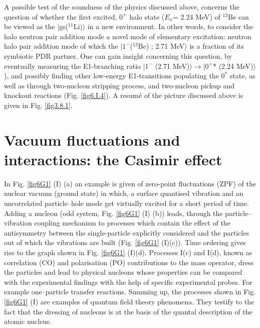 \begin{subappendices}
A  possible test of the soundness of the physics  discussed above, concerns the question of whether the first excited, 
$0^+$ halo state ($E_x$= 2.24 MeV) of $^{12}$Be can be viewed as the $|$gs($^{11}$Li$)\rangle$ in a new environment. In other words, 
to consider the halo neutron pair addition mode
 a novel mode of  elementary excitation: neutron halo pair  addition mode of which the $|1^- $($^{12}$Be) ; 2.71 MeV$\rangle $ is 
 a fraction of  its symbiotic  PDR partner. One can gain insight concerning this question, by 
 eventually measuring the E1-branching ratio $|1^-$ (2.71 MeV)$\rangle  \to |0^+$* (2.24 MeV)$\rangle$ ), and possibly 
 finding other low-energy E1-transitions populating the $0^*$ state, as well as through  two-nucleon stripping process,
 and two-nucleon pickup and knockout reactions (Fig. \ref{fig6.I.4}).
 A resum\'e of the picture discussed above is given   in Fig. \ref{fig3.8.1}. 
 \section[Vacuum fluctuations: the Casimir effect]{Vacuum fluctuations and interactions: the Casimir effect}\label{C7AppG}
In Fig. \ref{fig6G1} (I) (a) an example is given of  zero-point fluctuations (ZPF) of the nuclear vacuum (ground state) in which, a surface quantised vibration and an uncorrelated particle--hole mode get virtually excited for a short period of time.  Adding 
a nucleon (odd system, Fig. \ref{fig6G1} (I) (b)) leads, through the particle--vibration coupling mechanism to processes which contain the effect of the antisymmetry between the single-particle explicitly considered and the particles out of which  the vibrations are built  (Fig. \ref{fig6G1} (I)(c)). Time ordering 
gives rise to the graph shown in Fig. \ref{fig6G1} (I)(d). Processes I(c) and I(d),  known as correlation (CO) and polarisation (PO) contributions to the mass
operator,  dress the particles and lead to physical nucleons  whose properties can be compared with the experimental findings with the help of specific experimental probes. For example one--particle transfer reactions. Summing up, 
the processes shown in Fig. \ref{fig6G1} (I) are examples of quantum field theory phenomena. They testify  to the fact that the dressing of nucleons is at the basis of the quantal description of the atomic nucleus. 


\end{subappendices}
